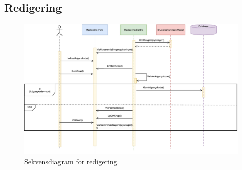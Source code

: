\subsection*{Redigering}

\begin{figure} [H]
\centering
\includegraphics[width=1\textwidth]{figures/Sek/SEKRedigering}
\caption{Sekvensdiagram for redigering.}
\label{fig:SEKRedigering}
\end{figure}